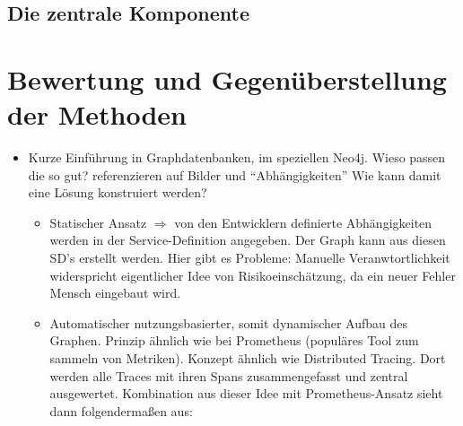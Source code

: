 \documentclass[
	12pt,
	BCOR=5mm,
	DIV=12,
	headinclude=on,
	footinclude=off,
	parskip=half,
	bibliography=totoc,
	listof=entryprefix,
	toc=listof,
	numbers=noenddot,
	plainfootsepline
]{scrreprt}
\begin{document}
\subsection{Die zentrale Komponente}

\section{Bewertung und Gegenüberstellung der Methoden}

\begin{itemize}
	\item Kurze Einführung in Graphdatenbanken, im speziellen Neo4j. Wieso passen die so gut? referenzieren auf Bilder und \enquote{Abhängigkeiten} Wie kann damit eine Lösung konstruiert werden?
	\begin{itemize}
		\item Statischer Ansatz $\Rightarrow$ von den Entwicklern definierte Abhängigkeiten werden in der Service-Definition angegeben. Der Graph kann aus diesen SD's erstellt werden. Hier gibt es Probleme: Manuelle Veranwtortlichkeit widerspricht eigentlicher Idee von Risikoeinschätzung, da ein neuer Fehler Mensch eingebaut wird.
		\item Automatischer nutzungsbasierter, somit dynamischer Aufbau des Graphen. Prinzip ähnlich wie bei Prometheus (populäres Tool zum sammeln von Metriken). Konzept ähnlich wie Distributed Tracing. Dort werden alle Traces mit ihren Spans zusammengefasst und zentral ausgewertet. Kombination aus dieser Idee mit Prometheus-Ansatz sieht dann folgendermaßen aus:
		

\end{itemize}
\end{itemize}
\end{document}
